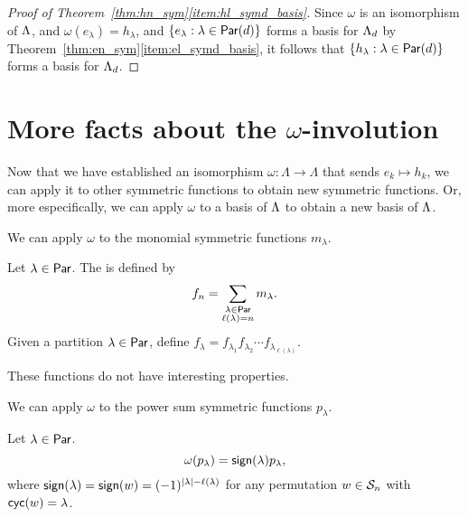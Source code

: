 \begin{proof}[Proof of Theorem~\ref{thm:hn_sym}\ref{item:hl_symd_basis}]
    Since \(\omega\) is an isomorphism of \(\operatorname{\Lambda}\), and \(\omega(e_\lambda) = h_\lambda\), and \(\{e_\lambda : \lambda \in \operatorname{\mathsf{Par}}(d)\}\) forms a basis for \(\operatorname{\Lambda}_d\) by Theorem~\ref{thm:en_sym}\ref{item:el_symd_basis}, it follows that \(\{h_\lambda : \lambda \in \operatorname{\mathsf{Par}}(d)\}\) forms a basis for \(\operatorname{\Lambda}_d\).
\end{proof}

\section{More facts about the \texorpdfstring{\(\omega\)}{omega}-involution}

Now that we have established an isomorphism \(\omega: \Lambda \to \Lambda\) that sends \(e_k \mapsto h_k\),
we can apply it to other symmetric functions to obtain new symmetric functions.
Or, more especifically, we can apply \(\omega\) to a basis of \(\operatorname{\Lambda}\) to obtain a new basis of \(\operatorname{\Lambda}\).

We can apply \(\omega\) to the monomial symmetric functions \(m_\lambda\).

\begin{definition}
		Let \(\lambda \in \operatorname{\mathsf{Par}}\).
	The  is defined by
	\begin{equation}
		f_n = \sum_{\substack{\lambda \in \operatorname{\mathsf{Par}} \\ \ell(\lambda) = n}} m_\lambda.
	\end{equation}
	Given a partition \(\lambda \in \operatorname{\mathsf{Par}}\), define \(f_\lambda = f_{\lambda_1}f_{\lambda_2}\cdots f_{\lambda_{\ell(\lambda)}}\).	
\end{definition}

These functions do not have interesting properties.

We can apply \(\omega\) to the power sum symmetric functions \(p_\lambda\).

\begin{theorem} \label{thm:omega-p-equals-pm-p}
	Let \(\lambda \in \operatorname{\mathsf{Par}}\).
	\begin{equation}
		\omega(p_\lambda) = \operatorname{\mathsf{sign}}(\lambda) p_{\lambda},
	\end{equation}
	where \(\operatorname{\mathsf{sign}}(\lambda) = \operatorname{\mathsf{sign}}(w) = (-1)^{|\lambda|-\ell(\lambda)}\) for any permutation \(w \in \mathcal{S}_{n}\) with \(\operatorname{\mathsf{cyc}}(w) = \lambda\).
\end{theorem}

